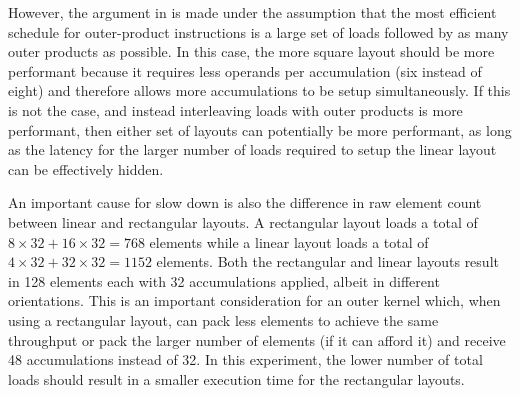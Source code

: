 \documentclass[\main/thesis.tex]{subfiles}
\begin{document}
However, the argument in  is made under the assumption that the most efficient schedule for outer-product instructions is a large set of loads followed by as many outer products as possible.
In this case, the more square layout should be more performant because it requires less operands per accumulation (six instead of eight) and therefore allows more accumulations to be setup simultaneously.
If this is not the case, and instead interleaving loads with outer products is more performant, then either set of layouts can potentially be more performant, as long as the latency for the larger number of loads required to setup the linear layout can be effectively hidden.

An important cause for slow down is also the difference in raw element count between linear and rectangular layouts.
A rectangular layout loads a total of $8 \times 32 + 16 \times 32 = 768$ elements while a linear layout loads a total of $4 \times 32 + 32 \times 32 = 1152$ elements.
Both the rectangular and linear layouts result in 128 elements each with 32 accumulations applied, albeit in different orientations.
This is an important consideration for an outer kernel which, when using a rectangular layout, can pack less elements to achieve the same throughput or pack the larger number of elements (if it can afford it) and receive 48 accumulations instead of 32.
In this experiment, the lower number of total loads should result in a smaller execution time for the rectangular layouts.
\end{document}
